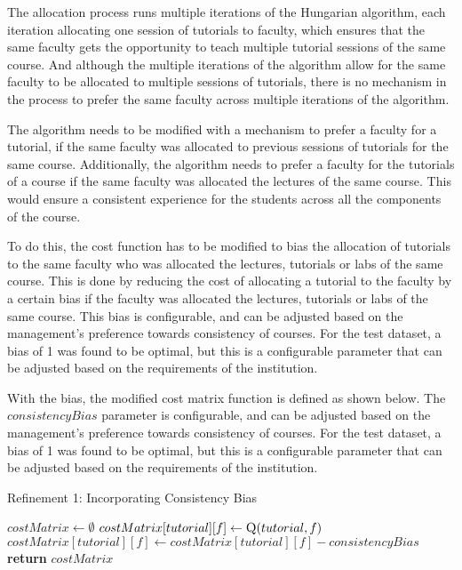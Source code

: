 The allocation process runs multiple iterations of the Hungarian algorithm, each iteration allocating one session of tutorials to faculty, which ensures that the same faculty gets the opportunity to teach multiple tutorial sessions of the same course. And although the multiple iterations of the algorithm allow for the same faculty to be allocated to multiple sessions of tutorials, there is no mechanism in the process to prefer the same faculty across multiple iterations of the algorithm.

The algorithm needs to be modified with a mechanism to prefer a faculty for a tutorial, if the same faculty was allocated to previous sessions of tutorials for the same course. Additionally, the algorithm needs  to prefer a faculty for the tutorials of a course if the same faculty was allocated the lectures of the same course. This would ensure a consistent experience for the students across all the components of the course.

To do this, the cost function has to be modified to bias the allocation of tutorials to the same faculty who was allocated the lectures, tutorials or labs of the same course. This is done by reducing the cost of allocating a tutorial to the faculty by a certain bias if the faculty was allocated the lectures, tutorials or labs of the same course. This bias is configurable, and can be adjusted based on the management's preference towards consistency of courses. For the test dataset, a bias of 1 was found to be optimal, but this is a configurable parameter that can be adjusted based on the requirements of the institution.

With the bias, the modified cost matrix function is defined as shown below. The $consistencyBias$ parameter is configurable, and can be adjusted based on the management's preference towards consistency of courses. For the test dataset, a bias of 1 was found to be optimal, but this is a configurable parameter that can be adjusted based on the requirements of the institution.

\begin{algorithm}[H]
  \caption*{Refinement 1: Incorporating Consistency Bias}
  \begin{algorithmic}
    \State $costMatrix \gets \emptyset$
    \State $costMatrix[tutorial][f] \gets \Call{Q}{tutorial, f}$
    \State $costMatrix[tutorial][f] \gets costMatrix[tutorial][f] - consistencyBias$
    \EndIf
    \EndFor
    \EndFor
    \State \textbf{return} $costMatrix$
    \EndProcedure
  \end{algorithmic}
\end{algorithm}

